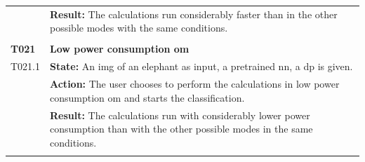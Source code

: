 \documentclass[parskip=full]{scrartcl}
\begin{document}
\begin{tabular}{p{2cm}p{11.4cm}}
& \textbf{Result:} The calculations run considerably faster than in the other possible modes with the same conditions.\\
& \\
\textbf{T021} \hypertarget{T021} & \textbf{Low \gls{power consumption} \gls{om}}\\
T021.1 & \textbf{State:} An \gls{img} of an elephant as input, a pretrained \gls{nn}, a \gls{dp} is given.\\
& \textbf{Action:} The user chooses to perform the calculations in low \gls{power consumption} \gls{om} and starts the classification.\\
& \textbf{Result:} The calculations run with considerably lower \gls{power consumption} than with the other possible modes in the same conditions.\\
& \\
\end{tabular}
\newpage
\end{document}
